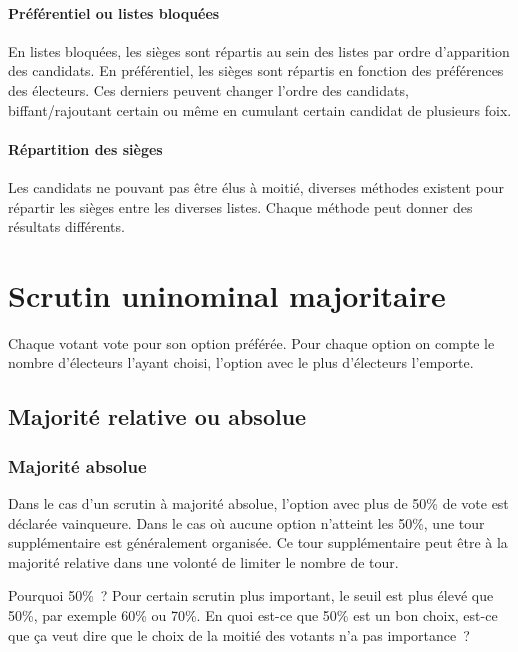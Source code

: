 \documentclass[../report]{subfiles}
\begin{document}
  \paragraph{Préférentiel ou listes bloquées}

  En listes bloquées, les sièges sont répartis au sein des listes par ordre d'apparition 
  des candidats.
  En préférentiel, les sièges sont répartis en fonction des préférences des électeurs.
  Ces derniers peuvent changer l'ordre des candidats, biffant/rajoutant certain ou même
  en cumulant certain candidat de plusieurs foix.
  
  \paragraph{Répartition des sièges}

  Les candidats ne pouvant pas être élus à moitié, diverses méthodes existent pour répartir
  les sièges entre les diverses listes.
  Chaque méthode peut donner des résultats différents.
  
  \section{Scrutin uninominal majoritaire}\label{diff:scrutin-majoritaire}
  
  Chaque votant vote pour son option préférée.
  Pour chaque option on compte le nombre d'électeurs l'ayant choisi, l'option avec le plus 
  d'électeurs l'emporte.
  
  \subsection{Majorité relative ou absolue}
  \subsubsection{Majorité absolue}
  Dans le cas d'un scrutin à majorité absolue, l'option avec plus de 50\% de vote est déclarée
  vainqueure.
  Dans le cas où aucune option n'atteint les 50\%, une tour supplémentaire est généralement
  organisée.
  Ce tour supplémentaire peut être à la majorité relative dans une volonté de limiter le nombre
  de tour.
  
  \begin{nota}{Pourquoi 50\%~?}
    Pour certain scrutin plus important, le seuil est plus élevé que 50\%, par exemple 60\% ou 70\%. 
    En quoi est-ce que 50\% est un bon choix, est-ce que ça veut dire que le choix de la moitié
    des votants n'a pas importance~? 
  \end{nota}
  
\end{document}

